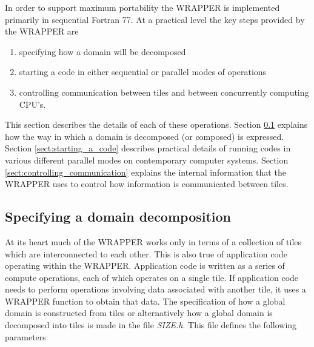 In order to support maximum portability the WRAPPER is implemented primarily 
in sequential Fortran 77. At a practical level the key steps provided by the 
WRAPPER are
\begin{enumerate}
\item specifying how a domain will be decomposed
\item starting a code in either sequential or parallel modes of operations
\item controlling communication between tiles and between concurrently
computing CPU's.
\end{enumerate} 
This section describes the details of each of these operations.
Section \ref{sect:specifying_a_decomposition} explains how the way in which
a domain is decomposed (or composed) is expressed. Section 
\ref{sect:starting_a_code} describes practical details of running codes
in various different parallel modes on contemporary computer systems. 
Section \ref{sect:controlling_communication} explains the internal information
that the WRAPPER uses to control how information is communicated between
tiles.

\subsection{Specifying a domain decomposition}
\label{sect:specifying_a_decomposition}

At its heart much of the WRAPPER works only in terms of a collection of tiles
which are interconnected to each other. This is also true of application
code operating within the WRAPPER. Application code is written as a series
of compute operations, each of which operates on a single tile. If
application code needs to perform operations involving data
associated with another tile, it uses a WRAPPER function to obtain
that data.
The specification of how a global domain is constructed from tiles or alternatively
how a global domain is decomposed into tiles is made in the file {\em SIZE.h}.
This file defines the following parameters \\

 \\

